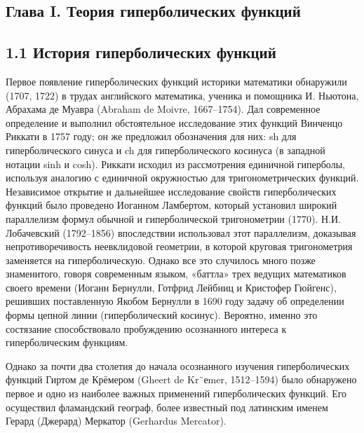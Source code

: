 \subsection*{Глава I. Теория гиперболических функций}

\subsection*{1.1 История гиперболических функций}

Первое появление гиперболических функций историки математики обнаружили (1707, 1722) в
трудах английского математика, ученика и помощника И. Ньютона, Абрахама де Муавра (Abraham
de Moivre, 1667–1754). Дал современное определение и выполнил обстоятельное исследование этих функций Винченцо Риккати в 1757 году; он
же предложил обозначения для них: sh для гиперболического синуса и ch для гиперболического
косинуса (в западной нотации sinh и cosh). Риккати исходил из рассмотрения единичной гиперболы, используя аналогию с единичной окружностью для тригонометрических функций. Независимое
открытие и дальнейшее исследование свойств гиперболических функций было проведено Иоганном
Ламбертом, который установил широкий параллелизм формул обычной и гиперболической тригонометрии (1770). Н.И. Лобачевский (1792–1856) впоследствии использовал этот параллелизм, доказывая непротиворечивость неевклидовой геометрии, в которой круговая тригонометрия заменяется
на гиперболическую. Однако все это случилось много позже знаменитого, говоря современным языком, «баттла» трех ведущих математиков своего времени (Иоганн Бернулли, Готфрид Лейбниц и
Кристофер Гюйгенс), решивших поставленную Якобом Бернулли в 1690 году задачу об определении
формы цепной линии (гиперболический косинус). Вероятно, именно это состязание способствовало
пробуждению осознанного интереса к гиперболическим функциям.

Однако за почти два столетия до начала осознанного изучения гиперболических функций Гиртом
де Крёмером (Gheert de Kr¨еmer, 1512–1594) было обнаружено первое и одно из наиболее важных
применений гиперболических функций. Его осуществил фламандский географ, более известный под
латинским именем Герард (Джерард) Меркатор (Gerhardus Mercator).

